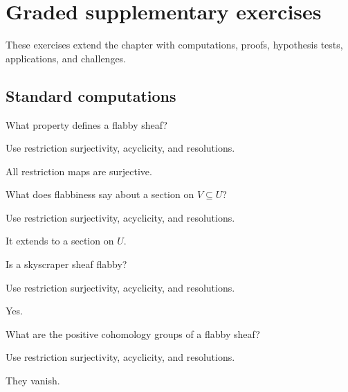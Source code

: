 \section{Graded supplementary exercises}
These exercises extend the chapter with computations, proofs, hypothesis tests, applications, and challenges.

\subsection*{Standard computations}

\begin{exercise}[Restriction]\label{exr:vi46-expand-01}
What property defines a flabby sheaf?
\end{exercise}
\begin{hint}
Use restriction surjectivity, acyclicity, and resolutions.
\end{hint}
\begin{solution}
All restriction maps are surjective.
\end{solution}

\begin{exercise}[Extension]\label{exr:vi46-expand-02}
What does flabbiness say about a section on $V\subseteq U$?
\end{exercise}
\begin{hint}
Use restriction surjectivity, acyclicity, and resolutions.
\end{hint}
\begin{solution}
It extends to a section on $U$.
\end{solution}

\begin{exercise}[Skyscraper]\label{exr:vi46-expand-03}
Is a skyscraper sheaf flabby?
\end{exercise}
\begin{hint}
Use restriction surjectivity, acyclicity, and resolutions.
\end{hint}
\begin{solution}
Yes.
\end{solution}

\begin{exercise}[Acyclicity]\label{exr:vi46-expand-04}
What are the positive cohomology groups of a flabby sheaf?
\end{exercise}
\begin{hint}
Use restriction surjectivity, acyclicity, and resolutions.
\end{hint}
\begin{solution}
They vanish.
\end{solution}


